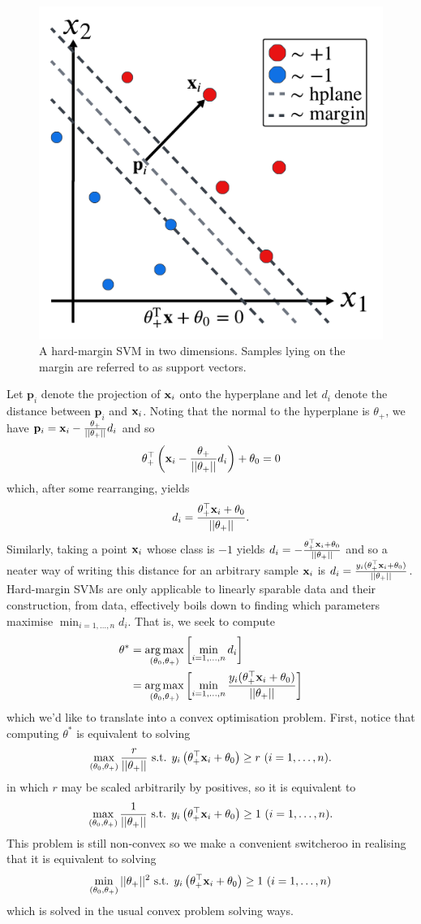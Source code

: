 \documentclass[11pt]{article}
\begin{document}
\begin{figure}[t]
    \centering
    \includegraphics[width=0.75\columnwidth]{./figures/supervised_learning/SVM_hard_margin.pdf}
    \caption{A hard-margin SVM in two dimensions. Samples lying on the margin are referred to as support vectors.}
    \label{fig:SVM_hard_margin}
\end{figure}

Let $\mathbf{p}_i$ denote the projection of $\mathbf{x}_i$ onto the hyperplane and let $d_i$ denote the distance between $\mathbf{p}_i$ and $\mathbf{x}_i$. Noting that the normal to the hyperplane is $\theta_+$, we have $\mathbf{p}_i=\mathbf{x}_i-\frac{\theta_+}{||\theta_+||}d_i$ and so
$$
\theta_+^\top \left(\mathbf{x}_i-\frac{\theta_+}{||\theta_+||}d_i\right)+\theta_0
=
0
$$
which, after some rearranging, yields
$$
d_i
=
\frac{\theta_+^\top \mathbf{x}_i+\theta_0}{||\theta_+||}.
$$
Similarly, taking a point $\mathbf{x}_i$ whose class is $-1$ yields $d_i=-\frac{\theta_+^\top \mathbf{x}_i+\theta_0}{||\theta_+||}$ and so a neater way of writing this distance for an arbitrary sample $\mathbf{x}_i$ is $d_i=\frac{y_i(\theta_+^\top \mathbf{x}_i+\theta_0)}{||\theta_+||}$. Hard-margin SVMs are only applicable to linearly sparable data and their construction, from data, effectively boils down to finding which parameters maximise $\min_{i=1,\dots,n}d_i$. That is, we seek to compute
\begin{align*}
    \theta^{*}
    &=
    \operatorname*{arg\,max}_{(\theta_0,\theta_+)}\left[\min_{i=1,\dots,n}d_i\right]\\
    &=
    \operatorname*{arg\,max}_{(\theta_0,\theta_+)}\left[\min_{i=1,\dots,n}\frac{y_i(\theta_+^\top \mathbf{x}_i+\theta_0)}{||\theta_+||}\right]
\end{align*}
which we'd like to translate into a convex optimisation problem. First, notice that computing $\theta^{*}$ is equivalent to solving
$$
\max_{(\theta_0,\theta_+)}\frac{r}{||\theta_+||}\text{ s.t. } y_i\left(\theta_+^\top \mathbf{x}_i+\theta_0\right)\geq r\text{ } (i=1,\dots,n).
$$
in which $r$ may be scaled arbitrarily by positives, so it is equivalent to
$$
\max_{(\theta_0,\theta_+)}\frac{1}{||\theta_+||}\text{ s.t. } y_i\left(\theta_+^\top \mathbf{x}_i+\theta_0\right)\geq 1\text{ } (i=1,\dots,n).
$$
This problem is still non-convex so we make a convenient switcheroo in realising that it is equivalent to solving
$$
\min_{(\theta_0,\theta_+)}||\theta_+||^2\text{ s.t. } y_i\left(\theta_+^\top \mathbf{x}_i+\theta_0\right)\geq 1\text{ } (i=1,\dots,n)
$$
which is solved in the usual convex problem solving ways.
\end{document}

